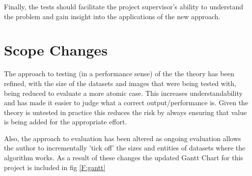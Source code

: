 Finally, the tests should facilitate the project supervisor's ability to understand the problem and gain insight into the applications of the new approach.

\section{Scope Changes}\label{S:ScopeChanges}
The approach to testing (in a performance sense) of the the theory has been refined, with the size of the datasets and images that were being tested with, being reduced to evaluate a more atomic case. This increases understandability and has made it easier to judge what a correct output/performance is. Given the theory is untested in practice this reduces the risk by always ensuring that value is being added for the appropriate effort.

Also, the approach to evaluation has been altered as ongoing evaluation allows the author to incrementally 'tick off' the sizes and entities of datasets where the algorithm works.
As a result of these changes the updated Gantt Chart for this project is included  in fig \ref{F:gantt}
